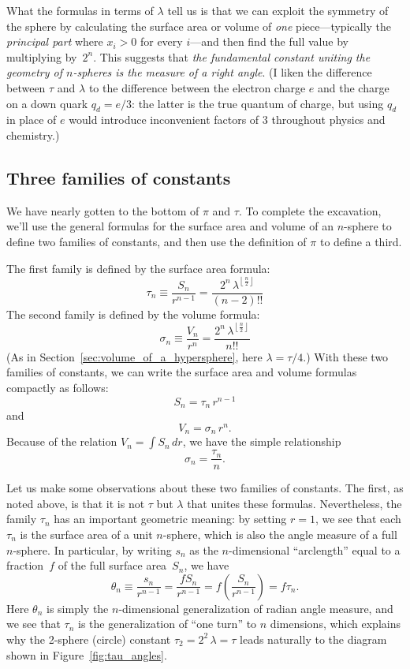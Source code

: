 What the formulas in terms of $\lambda$ tell us is that we can exploit the symmetry of the sphere by calculating the surface area or volume of \emph{one} piece---typically the \emph{principal part} where $x_i > 0$ for every $i$---and then find the full value by multiplying by~$2^n$. This suggests that \emph{the fundamental constant uniting the geometry of $n$-spheres is the measure of a right angle}. (I liken the difference between $\tau$ and $\lambda$ to the difference between the electron charge $e$ and the charge on a down quark $q_d = e/3$: the latter is the true quantum of charge, but using $q_d$ in place of $e$ would introduce inconvenient factors of $3$ throughout physics and chemistry.)


  \subsection{Three families of constants} %
  \label{sec:three_families_of_constants}

We have nearly gotten to the bottom of $\pi$ and $\tau$. To complete the excavation, we'll use the general formulas for the surface area and volume of an $n$-sphere to define two families of constants, and then use the definition of $\pi$ to define a third.

The first family is defined by the surface area formula:
\[
\tau_n \equiv \frac{S_n}{r^{n-1}} = \frac{2^n\,\lambda^{\left\lfloor \frac{n}{2} \right\rfloor}}{(n-2)!!}
\]
The second family is defined by the volume formula:
\[
\sigma_n \equiv \frac{V_n}{r^n} = \frac{2^n\,\lambda^{\left\lfloor \frac{n}{2} \right\rfloor}}{n!!}
\]
(As in Section~\ref{sec:volume_of_a_hypersphere}, here $\lambda = \tau/4$.)
With these two families of constants, we can write the surface area and volume formulas compactly as follows:
\[ S_n = \tau_n\,r^{n-1} \]
and
\[ V_n = \sigma_n\,r^n. \]
Because of the relation $V_n = \int S_n\,dr$, we have the simple relationship
\[
\sigma_n = \frac{\tau_n}{n}.
\]

Let us make some observations about these two families of constants. The first, as noted above, is that it is not $\tau$ but $\lambda$ that unites these formulas. Nevertheless, the family $\tau_n$ has an important geometric meaning: by setting $r=1$, we see that each $\tau_n$ is the surface area of a unit $n$-sphere, which is also the angle measure of a full $n$-sphere. In particular, by writing $s_n$ as the $n$-dimensional ``arclength'' equal to a fraction~$f$ of the full surface area~$S_n$, we have
\[
\theta_n \equiv \frac{s_n}{r^{n-1}} = \frac{f S_n}{r^{n-1}} = f\left(\frac{S_n}{r^{n-1}}\right) = f\tau_n.
\]
Here $\theta_n$ is simply the $n$-dimensional generalization of radian angle measure, and we see that $\tau_n$ is the generalization of ``one turn'' to $n$ dimensions, which explains why the 2-sphere (circle) constant $\tau_2 = 2^2\,\lambda = \tau$ leads naturally to the diagram shown in Figure~\ref{fig:tau_angles}.

